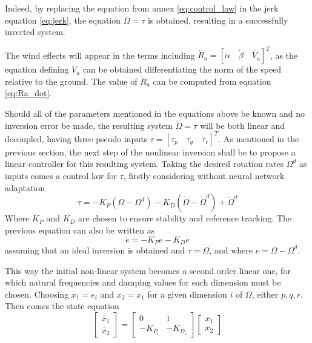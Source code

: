 Indeed, by replacing the equation from annex \ref{eq:control_law} in the jerk equation \ref{eq:jerk}, the equation $\ddot{\Omega} = \tau$ is obtained, resulting in a successfully inverted system.


The wind effects will appear in the terms including $\dot{R}_a =  [\dot{\alpha} \quad \dot{\beta} \quad \dot{V_a}]^T$, as the equation defining $\dot{V_a}$ can be obtained differentiating the norm of the speed relative to the ground. The value of $\dot{R}_a$ can be computed from equation \ref{eq:Ra_dot}.

Should all of the parameters mentioned in the equations above be known and no inversion error be made, the resulting system $\ddot{\Omega}=\tau$ will be both linear and decoupled, having three pseudo inputs $\tau = [\tau_p \quad \tau_q \quad \tau_r]^T$. As mentioned in the previous section, the next step of the nonlinear inversion shall be to propose a linear controller for this resulting system. Taking the desired rotation rates $\Omega^d$ as inputs comes a control law for $\tau$, firstly considering without neural network adaptation
\begin{equation}
\tau = -K_P (\Omega-\Omega^d)-K_D (\dot{\Omega}-\dot{\Omega}^d)+\ddot{\Omega}^d
\label{eq:linear_controller}
\end{equation}
Where $K_P$ and $K_D$ are chosen to ensure stability and reference tracking. The previous equation can also be written as
\begin{equation}
\ddot{e}=-K_P e - K_D \dot{e}
\end{equation}
assuming that an ideal inversion is obtained and $\tau=\ddot{\Omega}$, and where $e=\Omega-\Omega^d$. 

This way the initial non-linear system becomes a second order linear one, for which natural frequencies and damping values for each dimension must be chosen. Choosing $x_1=e_i$ and $x_2=\dot{x_1}$ for a given dimension $i$ of $\Omega$, either $p,q,r$. Then comes the state equation
\begin{equation}
\begin{bmatrix}
\dot{x_1}\\
\dot{x_2}
\end{bmatrix}=
\begin{bmatrix}
0 & 1\\
-K_{P_i} & -K_{D_i}
\end{bmatrix}
\begin{bmatrix}
x_1\\
x_2
\end{bmatrix}
\end{equation}

